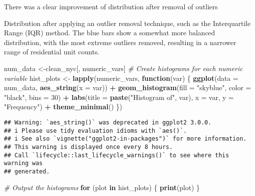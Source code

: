 \documentclass[
]{article}
\newenvironment{Shaded}{\begin{snugshade}}{\end{snugshade}}
\newcommand{\AttributeTok}[1]{\textcolor[rgb]{0.13,0.29,0.53}{#1}}
\newcommand{\CommentTok}[1]{\textcolor[rgb]{0.56,0.35,0.01}{\textit{#1}}}
\newcommand{\ControlFlowTok}[1]{\textcolor[rgb]{0.13,0.29,0.53}{\textbf{#1}}}
\newcommand{\DecValTok}[1]{\textcolor[rgb]{0.00,0.00,0.81}{#1}}
\newcommand{\FunctionTok}[1]{\textcolor[rgb]{0.13,0.29,0.53}{\textbf{#1}}}
\newcommand{\NormalTok}[1]{#1}
\newcommand{\OtherTok}[1]{\textcolor[rgb]{0.56,0.35,0.01}{#1}}
\newcommand{\SpecialCharTok}[1]{\textcolor[rgb]{0.81,0.36,0.00}{\textbf{#1}}}
\newcommand{\StringTok}[1]{\textcolor[rgb]{0.31,0.60,0.02}{#1}}
\begin{document}
There was a clear improvement of distribution after removal of outliers

Distribution after applying an outlier removal technique, such as the
Interquartile Range (IQR) method. The blue bars show a somewhat more
balanced distribution, with the most extreme outliers removed, resulting
in a narrower range of residential unit counts.

\begin{Shaded}
\begin{Highlighting}[]
\NormalTok{num\_data }\OtherTok{\textless{}{-}}\NormalTok{clean\_nyc[, numeric\_vars] }
\CommentTok{\# Create histograms for each numeric variable}
\NormalTok{hist\_plots }\OtherTok{\textless{}{-}} \FunctionTok{lapply}\NormalTok{(numeric\_vars, }\ControlFlowTok{function}\NormalTok{(var) \{}
  \FunctionTok{ggplot}\NormalTok{(}\AttributeTok{data =}\NormalTok{ num\_data, }\FunctionTok{aes\_string}\NormalTok{(}\AttributeTok{x =}\NormalTok{ var)) }\SpecialCharTok{+}
    \FunctionTok{geom\_histogram}\NormalTok{(}\AttributeTok{fill =} \StringTok{"skyblue"}\NormalTok{, }\AttributeTok{color =} \StringTok{"black"}\NormalTok{, }\AttributeTok{bins =} \DecValTok{30}\NormalTok{) }\SpecialCharTok{+}
    \FunctionTok{labs}\NormalTok{(}\AttributeTok{title =} \FunctionTok{paste}\NormalTok{(}\StringTok{"Histogram of"}\NormalTok{, var),}
         \AttributeTok{x =}\NormalTok{ var,}
         \AttributeTok{y =} \StringTok{"Frequency"}\NormalTok{) }\SpecialCharTok{+}
    \FunctionTok{theme\_minimal}\NormalTok{()}
\NormalTok{\})}
\end{Highlighting}
\end{Shaded}

\begin{verbatim}
## Warning: `aes_string()` was deprecated in ggplot2 3.0.0.
## i Please use tidy evaluation idioms with `aes()`.
## i See also `vignette("ggplot2-in-packages")` for more information.
## This warning is displayed once every 8 hours.
## Call `lifecycle::last_lifecycle_warnings()` to see where this warning was
## generated.
\end{verbatim}

\begin{Shaded}
\begin{Highlighting}[]
\CommentTok{\# Output the histograms}
\ControlFlowTok{for}\NormalTok{ (plot }\ControlFlowTok{in}\NormalTok{ hist\_plots) \{}
  \FunctionTok{print}\NormalTok{(plot)}
\NormalTok{\}}
\end{Highlighting}
\end{Shaded}
\end{document}
